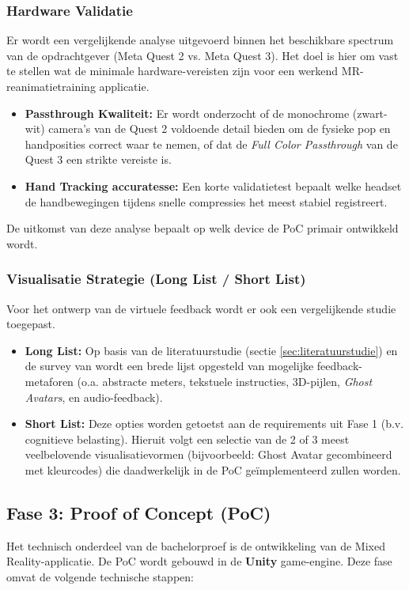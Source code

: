 \subsubsection{Hardware Validatie}
Er wordt een vergelijkende analyse uitgevoerd binnen het beschikbare spectrum van de opdrachtgever (Meta Quest 2 vs. Meta Quest 3). Het doel is hier om vast te stellen wat de minimale hardware-vereisten zijn voor een
werkend MR-reanimatietraining applicatie.
\begin{itemize}
    \item \textbf{Passthrough Kwaliteit:} Er wordt onderzocht of de monochrome (zwart-wit) camera's van de Quest 2 voldoende detail bieden om de fysieke pop en handposities correct waar te nemen, of dat de \textit{Full Color Passthrough} van de Quest 3 een strikte vereiste is.
    \item \textbf{Hand Tracking accuratesse:} Een korte validatietest bepaalt welke headset de handbewegingen tijdens snelle compressies het meest stabiel registreert.
\end{itemize}
De uitkomst van deze analyse bepaalt op welk device de PoC primair ontwikkeld wordt.

\subsubsection{Visualisatie Strategie (Long List / Short List)}
Voor het ontwerp van de virtuele feedback wordt er ook een vergelijkende studie toegepast.
\begin{itemize}
    \item \textbf{Long List:} Op basis van de literatuurstudie (sectie \ref{sec:literatuurstudie}) en de survey van \textcite{Diller2024} wordt een brede lijst opgesteld van mogelijke 
    feedback-metaforen (o.a. abstracte meters, tekstuele instructies, 3D-pijlen, \textit{Ghost Avatars}, en audio-feedback).
    \item \textbf{Short List:} Deze opties worden getoetst aan de requirements uit Fase 1 (b.v. cognitieve belasting). 
    Hieruit volgt een selectie van de 2 of 3 meest veelbelovende visualisatievormen (bijvoorbeeld: Ghost Avatar gecombineerd met kleurcodes) die daadwerkelijk in de PoC geïmplementeerd zullen worden.
\end{itemize}

\subsection{Fase 3: Proof of Concept (PoC)}
Het technisch onderdeel van de bachelorproef is de ontwikkeling van de Mixed Reality-applicatie. De PoC wordt gebouwd in de \textbf{Unity} game-engine. 
Deze fase omvat de volgende technische stappen:

